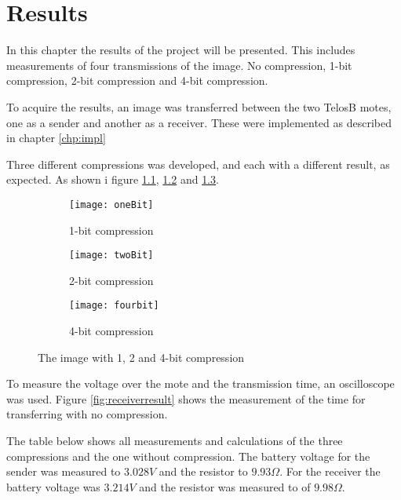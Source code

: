 \chapter{Results}
\label{chp:results}

In this chapter the results of the project will be presented. This includes measurements of four transmissions of the image. No compression, 1-bit compression, 2-bit compression and 4-bit compression.

To acquire the results, an image was transferred between the two TelosB motes, one as a sender and another as a receiver. These were implemented as described in chapter \ref{chp:impl}

Three different compressions was developed, and each with a different result, as expected. As shown i figure \ref{fig:one}, \ref{fig:two} and \ref{fig:four}.

\begin{figure}[h]
	\centering
	\begin{subfigure}{0.3\textwidth}
		\texttt{[image: oneBit]}
		\caption{1-bit compression}
		\label{fig:one}
	\end{subfigure}
	\begin{subfigure}{0.3\textwidth}
		\texttt{[image: twoBit]}
		\caption{2-bit compression}
		\label{fig:two}
	\end{subfigure}
	\begin{subfigure}{0.3\textwidth}
		\texttt{[image: fourbit]}
		\caption{4-bit compression}
		\label{fig:four}
	\end{subfigure}
	\caption{The image with 1, 2 and 4-bit compression}\label{fig:animals}
\end{figure}


To measure the voltage over the mote and the transmission time, an oscilloscope was used. Figure \ref{fig:receiverresult} shows the measurement of the time for transferring with no compression. 



The table below shows all measurements and calculations of the three compressions and the one without compression. The battery voltage for the sender was measured to $3.028V$ and the resistor to $9.93\Omega$. For the receiver the battery voltage was $3.214V$ and the resistor was measured to of $9.98\Omega$.

